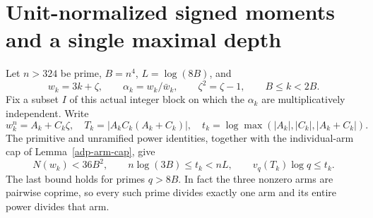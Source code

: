 \section{Unit-normalized signed moments and a single maximal depth}
\label{usm-section}

Let \(n>324\) be prime, \(B=n^4\), \(L=\log(8B)\), and
\[
 w_k=3k+\zeta,\qquad \alpha_k=w_k/\bar w_k,\qquad \zeta^2=\zeta-1,
 \qquad B\leq k<2B .
\]
Fix a subset \(I\) of this actual integer block on which the
\(\alpha_k\) are multiplicatively independent. Write
\[
 w_k^n=A_k+C_k\zeta,\quad T_k=|A_kC_k(A_k+C_k)|,\quad
 t_k=\log\max(|A_k|,|C_k|,|A_k+C_k|).
\]
The primitive and unramified power identities, together with the
individual-arm cap of Lemma~\ref{adp-arm-cap}, give
\begin{equation}\label{usm-height}
 N(w_k)<36B^2,\qquad
 n\log(3B)\leq t_k<nL,\qquad v_q(T_k)\log q\leq t_k .
\end{equation}
The last bound holds for primes \(q>8B\). In fact the three nonzero
arms are pairwise coprime, so every such prime divides exactly one
arm and its entire power divides that arm.

